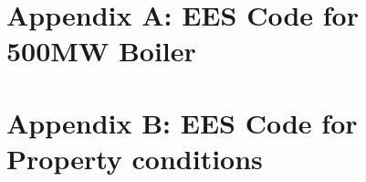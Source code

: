 \documentclass[compileTAMUreport.tex]{subfiles}
\begin{document}
\appendix       %
\section*{Appendix A: EES Code for 500MW Boiler}
\section*{Appendix B: EES Code for Property conditions}
%
\end{document}
